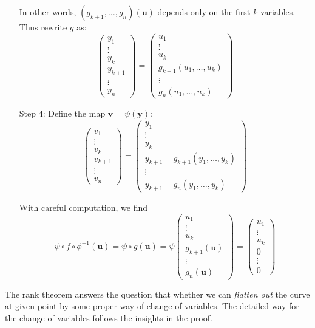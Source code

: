 \begin{enumerate}
In other words, $(g_{k+1},\dots,g_n)(\bm u)$ depends only on the first $k$ variables. Thus rewrite $g$ as:
\[
\begin{pmatrix}
y_1\\\vdots\\y_k\\y_{k+1}\\\vdots\\y_n
\end{pmatrix}
=
\begin{pmatrix}
u_1\\\vdots\\u_k\\g_{k+1}(u_1,\dots,u_k)\\\vdots\\g_n(u_1,\dots,u_k)
\end{pmatrix}
\]
\item[Step 4:] Define the map $\bm v=\psi(\bm y)$:
\[
\begin{pmatrix}
v_1\\\vdots\\v_k\\v_{k+1}\\\vdots\\v_n
\end{pmatrix}
=
\begin{pmatrix}
y_1\\\vdots\\y_k\\y_{k+1}-g_{k+1}(y_1,\dots,y_k)\\\vdots\\
y_{k+1} - g_n(y_1,\dots,y_k)
\end{pmatrix}
\]

With careful computation, we find
\[
\psi\circ f\circ\phi^{-1}(\bm u)=\psi\circ g(\bm u)=\psi\begin{pmatrix}
u_1\\\vdots\\u_k\\g_{k+1}(\bm u)\\\vdots\\g_n(\bm u)
\end{pmatrix}=\begin{pmatrix}
u_1\\\vdots\\u_k\\0\\\vdots\\0
\end{pmatrix}
\]
\end{enumerate}
\begin{remark}
The rank theorem answers the question that whether we can \emph{flatten out} the curve at given point by some proper way of change of variables. The detailed way for the change of variables follows the insights in the proof.
\end{remark}

